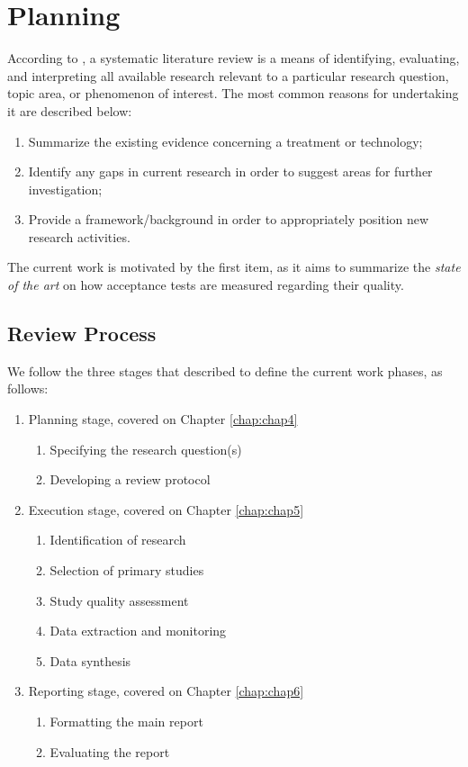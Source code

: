 \chapter{\label{chap:chap3}{Planning}}

According to \cite{Kitchenham_2007}, a systematic literature review is a means of identifying, evaluating, and interpreting all available research relevant to a particular research question, topic area, or phenomenon of interest. The most common reasons for undertaking it are described below:

\begin{enumerate}
\item Summarize the existing evidence concerning a treatment or technology; 
\item Identify any gaps in current research in order to suggest areas for further investigation; 
\item Provide a framework/background in order to appropriately position new research activities.
\end{enumerate}

The current work is motivated by the first item, as it aims to summarize the \textit{state of the art} on how acceptance tests are measured regarding their quality.

\section{Review Process}

We follow the three stages that \cite{Kitchenham_2007} described to define the current work phases, as follows:

\begin{enumerate} 
\item Planning stage, covered on Chapter \ref{chap:chap4}
    \begin{enumerate}
    \item Specifying the research question(s)
    \item Developing a review protocol
    \end{enumerate}
\item Execution stage, covered on Chapter \ref{chap:chap5}
    \begin{enumerate}
    \item Identification of research
    \item Selection of primary studies
    \item Study quality assessment
    \item Data extraction and monitoring
    \item Data synthesis
    \end{enumerate}
\item Reporting stage, covered on Chapter \ref{chap:chap6}
    \begin{enumerate}
    \item Formatting the main report 
    \item Evaluating the report 
    \end{enumerate}
\end{enumerate}

